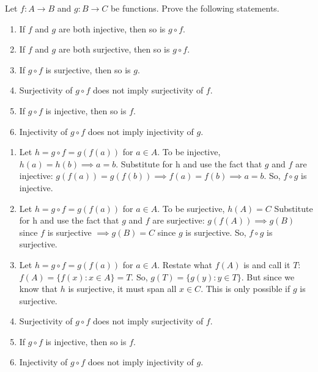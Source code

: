 \documentclass[12pt,letterpaper,boxed]{hmcpset}
\begin{document}
\begin{problem}[Exercise 3.4.]
Let $f: A \rightarrow B$ and $g : B \rightarrow C$ be functions. Prove the following statements.
\vspace{-2mm}
\begin{enumerate}
	\itemsep0em
	\item If $f$ and $g$ are both injective, then so is $g \circ f.$
	\item If $f$ and $g$ are both surjective, then so is $g \circ f.$
	\item If $g \circ f$ is surjective, then so is $g$.
	\item Surjectivity of $g \circ f$ does not imply surjectivity of $f$.
	\item If $g \circ f$ is injective, then so is $f$.
	\item Injectivity of $g \circ f$ does not imply injectivity of $g$.
\end{enumerate}
\end{problem}
\begin{solution}
\begin{enumerate}
	\itemsep0em
	\item Let $h = g \circ f = g(f(a)) $ for $ a \in A.$ To be injective, $h(a) = h(b) \implies a = b.$ Substitute for h and use the fact that $g$ and $f$ are injective: $g(f(a))=g(f(b)) \implies f(a) = f(b) \implies a = b.$ So, $f \circ g$ is injective.
	\item Let $h = g \circ f = g(f(a)) $ for $ a \in A.$ To be surjective, $h(A)=C$ Substitute for h and use the fact that $g$ and $f$ are surjective: $g(f(A)) \implies g(B)$ since $f$ is surjective $ \implies g(B)=C$ since $g$ is surjective. So, $f \circ g$ is surjective.
	\item Let $h = g \circ f = g(f(a)) $ for $ a \in A.$ Restate what $f(A)$ is and call it $T$: $f(A) = \{f(x) : x \in A\} = T.$ So, $ g(T)=\{g(y) : y \in T\}$. But since we know that $h$ is surjective, it must span all $x \in C.$ This is only possible if $g$ is surjective.
	\item Surjectivity of $g \circ f$ does not imply surjectivity of $f$.
	\item If $g \circ f$ is injective, then so is $f$.
	\item Injectivity of $g \circ f$ does not imply injectivity of $g$.
\end{enumerate}
\end{solution}
\end{document}
